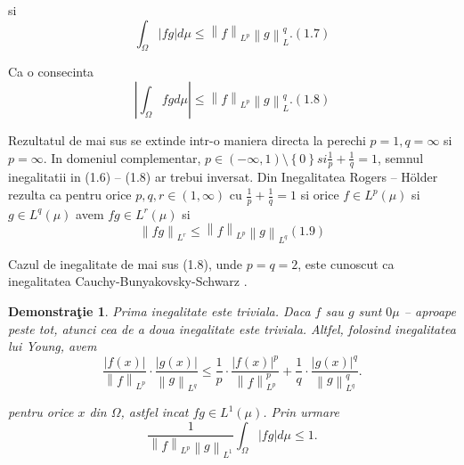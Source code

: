 \documentclass[a4paper,12pt,oneside]{report}
\newtheorem{demonstration}{Demonstra\c tie}
\begin{document}
si 
\begin{displaymath}
  \int_{\Omega}^{}\left | fg \right |d\mu \leq \left \| f \right \|_{L^{p}}\left \| g \right \|_{L}^{q} . (1.7)
\end{displaymath}

	Ca o consecinta 
\begin{displaymath}
  \left | \int_{\Omega}^{} fg  d\mu \right |\leq \left \| f \right \|_{L^{p}}\left \| g \right \|_{L}^{q}. (1.8)
\end{displaymath}

	Rezultatul de mai sus se extinde intr-o maniera directa la perechi \(p = 1, q = \infty\) si \(p = \infty\). In domeniul complementar, \(p\in \left ( -\infty , 1 \right )\setminus \left \{ 0 \right \} si \frac{1}{p} + \frac{1}{q} = 1\), semnul inegalitatii in (1.6) – (1.8) ar trebui inversat. 
	Din Inegalitatea Rogers – Hölder rezulta ca pentru orice \(p, q, r \in \left ( 1 , \infty  \right )\) cu \(\frac{1}{p} + \frac{1}{q} = 1\) si orice \(f\in L^{p}\left ( \mu  \right )\) si \(g\in L^{q}\left ( \mu  \right )\) avem \(fg\in L^{r}\left ( \mu  \right )\) si 
\begin{displaymath}
  \left \| fg \right \|_{L^{r}}\leq \left \| f \right \|_{L^{p}}\left \| g \right \|_{L^{q}} (1.9)
\end{displaymath}


Cazul de inegalitate de mai sus (1.8), unde \(p = q = 2\), este cunoscut ca inegalitatea Cauchy-Bunyakovsky-Schwarz . 

\begin{demonstration}
Prima inegalitate este triviala. Daca \(f\) sau \(g\) sunt \(0 \mu\) – aproape peste tot, atunci cea de a doua inegalitate este triviala. Altfel, folosind inegalitatea lui Young, avem 
\begin{displaymath}
  \frac{\left | f\left ( x \right ) \right |}{\left \| f \right \|_{L^{p}}} \cdot \frac{\left | g\left ( x \right ) \right |}{\left \| g \right \|_{L^{q}}}\leq \frac{1}{p}\cdot \frac{\left | f\left ( x \right ) \right |^{p}}{\left \| f \right \|^{p}_{L^{p}}} + \frac{1}{q}\cdot \frac{\left | g\left ( x \right ) \right |^{q}}{\left \| g \right \|^{q}_{L^{q}}}.
\end{displaymath}
 
pentru orice \(x\) din \(\Omega\), astfel incat \(fg \in L^{1}\left ( \mu  \right )\). Prin urmare 
\begin{displaymath}
  \frac{1}{\left \| f \right \|_{L^{p}}\left \| g \right \|_{L^{1}}}\int_{\Omega }\left | fg \right |d\mu \leq 1.
\end{displaymath}
\end{demonstration}
\end{document}
